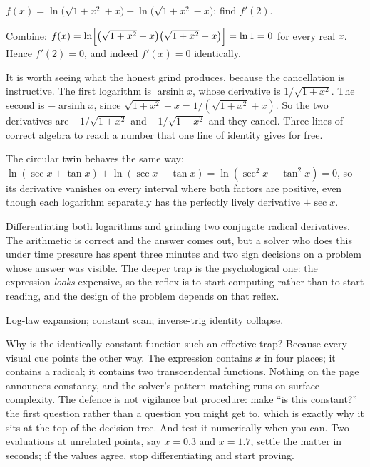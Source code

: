\begin{worked}
$f(x)=\ln\bigl(\sqrt{1+x^{2}}+x\bigr)+\ln\bigl(\sqrt{1+x^{2}}-x\bigr)$; find $f'(2)$.

Combine: $f(x)=\ln\Bigl[\bigl(\sqrt{1+x^{2}}+x\bigr)\bigl(\sqrt{1+x^{2}}-x\bigr)\Bigr]=\ln 1=0$ for every real $x$. Hence $f'(2)=0$, and indeed $f'(x)=0$ identically.

It is worth seeing what the honest grind produces, because the cancellation is instructive. The first logarithm is $\operatorname{arsinh}x$, whose derivative is $1/\sqrt{1+x^{2}}$. The second is $-\operatorname{arsinh}x$, since $\sqrt{1+x^{2}}-x=1/(\sqrt{1+x^{2}}+x)$. So the two derivatives are $+1/\sqrt{1+x^{2}}$ and $-1/\sqrt{1+x^{2}}$ and they cancel. Three lines of correct algebra to reach a number that one line of identity gives for free.

The circular twin behaves the same way: $\ln(\sec x+\tan x)+\ln(\sec x-\tan x)=\ln(\sec^{2}x-\tan^{2}x)=0$, so its derivative vanishes on every interval where both factors are positive, even though each logarithm separately has the perfectly lively derivative $\pm\sec x$.
\end{worked}

\begin{trap}
Differentiating both logarithms and grinding two conjugate radical derivatives. The arithmetic is correct and the answer comes out, but a solver who does this under time pressure has spent three minutes and two sign decisions on a problem whose answer was visible. The deeper trap is the psychological one: the expression \emph{looks} expensive, so the reflex is to start computing rather than to start reading, and the design of the problem depends on that reflex.
\end{trap}

\begin{seealsob}Log-law expansion; constant scan; inverse-trig identity collapse.\end{seealsob}

Why is the identically constant function such an effective trap? Because every visual cue points the other way. The expression contains $x$ in four places; it contains a radical; it contains two transcendental functions. Nothing on the page announces constancy, and the solver's pattern-matching runs on surface complexity. The defence is not vigilance but procedure: make ``is this constant?'' the first question rather than a question you might get to, which is exactly why it sits at the top of the decision tree. And test it numerically when you can. Two evaluations at unrelated points, say $x=0.3$ and $x=1.7$, settle the matter in seconds; if the values agree, stop differentiating and start proving.

